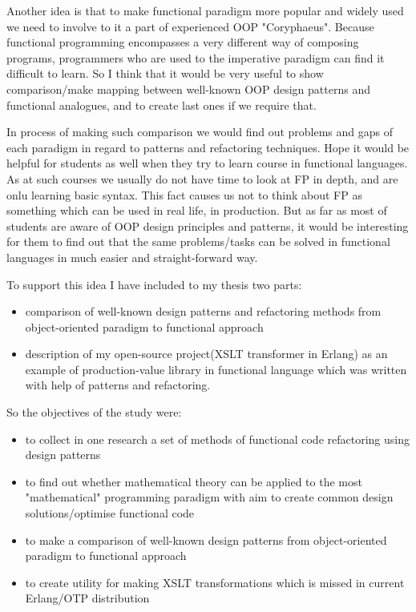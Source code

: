 Another idea is that to make functional paradigm more popular and widely used we need to involve to it a part of experienced OOP "Coryphaeus". Because functional programming encompasses a very different way of composing programs, programmers who are used to the imperative paradigm can find it difficult to learn.
So I think that it would be very useful to show comparison/make mapping between well-known OOP design patterns and functional analogues, and to create last ones if we require that.

In process of making such comparison we would find out problems and gaps of each paradigm in regard to patterns and refactoring techniques.
Hope it would be helpful for students as well when they try to learn course in functional languages. As at such courses we usually do not have time to look at FP in depth, and are onlu learning basic syntax. This fact causes us not to think about FP as something which can be used in real life, in production.
But as far as most of students are aware of OOP design principles and patterns, it would be interesting for them to find out that the same problems/tasks can be solved in functional languages in much easier and straight-forward way. 

To support this idea I have included to my thesis two parts:
\begin{itemize}
	\item comparison of well-known design patterns and refactoring methods from object-oriented paradigm to functional approach
	\item description of my open-source project(XSLT transformer in Erlang) as an example of production-value library in functional language which was written with help of patterns and refactoring.
\end{itemize}

So the objectives of the study were:
\begin{itemize}
	\item to collect in one research a set of methods of functional code refactoring using design patterns
	\item to find out whether mathematical theory can be applied to the most "mathematical" programming paradigm with aim to create common design solutions/optimise functional code
	\item to make a comparison of well-known design patterns from object-oriented paradigm to functional approach
	\item to create utility for making XSLT transformations which is missed in current Erlang/OTP distribution
\end{itemize}

